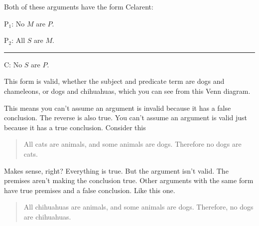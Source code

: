 {Both of these arguments have the form Celarent: 

\begin{earg}
\item[P$_1$:] No $M$ are $P$.
\item[P$_2$:] All $S$ are $M$.
\vspace{-.5em}
\item [] \rule{0.15\linewidth}{.5pt} 
\item[C:] No $S$ are $P$.
\end{earg} 

This form is valid, whether the subject and predicate term are dogs and chameleons, or dogs and chihuahuas, which you can see from this Venn diagram.

\begin{center}
\end{center}

This means you can't assume an argument is invalid because it has a false conclusion. The reverse is also true. You can't assume an argument is valid just because it has a true conclusion. Consider this 

\begin{quotation}  All cats are animals, and some animals are dogs. Therefore no dogs are cats. \end{quotation}

Makes sense, right? Everything is true. But the argument isn't valid. The premises aren't making the conclusion true. Other arguments with the same form have true premises and a false conclusion. Like this one.

\begin{quotation}All chihuahuas are animals, and some animals are dogs. Therefore, no dogs are chihuahuas.\end{quotation}

}

